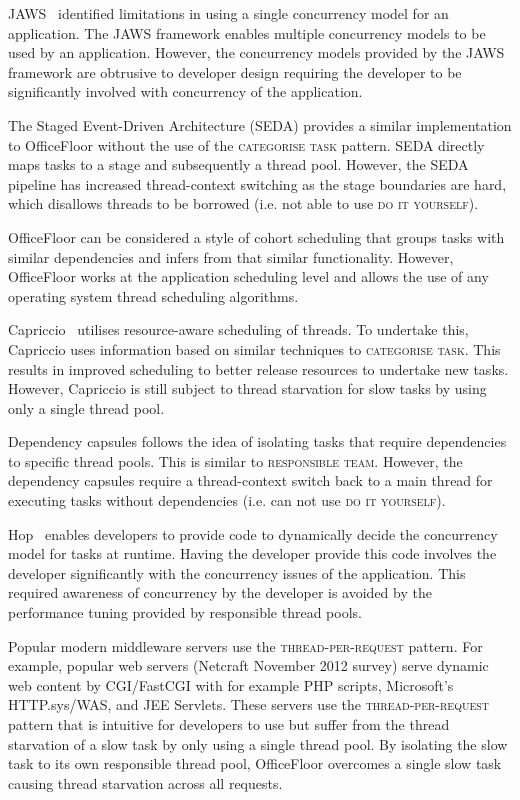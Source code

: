 \documentclass[prodmode]{style/acmlarge}
\begin{document}
JAWS~\cite{jaws} identified limitations in using a single concurrency model for
an application.  The JAWS framework enables multiple concurrency models to be
used by an application.  However, the concurrency models provided by the JAWS
framework are obtrusive to developer design requiring the developer to be
significantly involved with concurrency of the application.

The Staged Event-Driven Architecture (SEDA) \cite{seda} provides a similar
implementation to OfficeFloor without the use of the \textsc{categorise task}
pattern.  SEDA directly maps tasks to a stage and subsequently a thread pool.
However, the SEDA pipeline has increased thread-context switching as the stage
boundaries are hard, which disallows threads to be borrowed (i.e. not able to
use \textsc{do it yourself}).

OfficeFloor can be considered a style of cohort scheduling \cite{cohort}
that groups tasks with similar dependencies and infers from that similar
functionality.  However, OfficeFloor works at the application scheduling
level and allows the use of any operating system thread scheduling algorithms.

Capriccio~\cite{capriccio} utilises resource-aware scheduling of threads.  To
undertake this, Capriccio uses information based on similar techniques to
\textsc{categorise task}.  This results in improved scheduling to better release
resources to undertake new tasks.  However, Capriccio is still subject to thread
starvation for slow tasks by using only a single thread pool.

Dependency capsules \cite{dependency-capsules} follows the idea of isolating
tasks that require dependencies to specific thread pools.  This is similar to
\textsc{responsible team}.  However, the dependency capsules require a
thread-context switch back to a main thread for executing tasks without
dependencies (i.e. can not use \textsc{do it yourself}).

Hop~\cite{hop} enables developers to provide code to dynamically decide the
concurrency model for tasks at runtime.  Having the developer provide this code
involves the developer significantly with the concurrency issues of the
application.  This required awareness of concurrency by the developer is
avoided by the performance tuning provided by responsible thread pools.

Popular modern middleware servers use the \textsc{thread-per-request} pattern.
For example, popular web servers (Netcraft November 2012 survey) serve dynamic
web content by CGI/FastCGI with for example PHP scripts, Microsoft's
HTTP.sys/WAS, and JEE Servlets. These servers use the
\textsc{thread-per-request} pattern that is intuitive for developers to use but
suffer from the thread starvation of a slow task by only using a single thread
pool.  By isolating the slow task to its own responsible thread pool,
OfficeFloor overcomes a single slow task causing thread starvation across all
requests.
\end{document}

